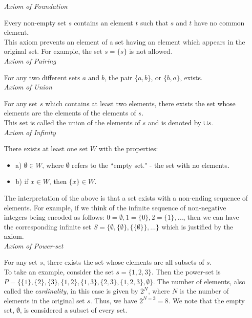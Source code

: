 \textit{Axiom of Foundation}

Every non-empty set $s$ contains an element $t$ such that $s$ and $t$ have no common element.\\

This axiom prevents an element of a set having an element which appears in the original set.  For example, the set $s=\{s\}$ is not allowed.\\

\textit{Axiom of Pairing}

For any two different sets $a$ and $b$, the pair $\{a,b\}$, or $\{b,a\}$, exists.\\

\textit{Axiom of Union}

For any set $s$ which contains at least two elements, there exists the set whose elements are the elements of the elements of $s.$ \\ 

This set is called the union of the elements of $s$ and is denoted by $\cup s.$  \\

\textit{Axiom of Infinity}

There exists at least one set $W$ with the properties:

\begin{itemize}
\item a) $\emptyset \in W$, where $\emptyset$ refers to the ``empty set." - the set with no elements.
\item b) if $x \in W$, then $\{x\} \in W.$
\end{itemize}

The interpretation of the above is that a set exists with a non-ending sequence of elements.  For example, if we think of the infinite sequence of non-negative integers being encoded as follows:  $0 = \emptyset, 1=\{ 0 \}, 2=\{1\}, \ldots$, then we can have the corresponding infinite set $S=\{\emptyset, \{\emptyset\}, \{\{\emptyset\}\}, \ldots \}$ which is justified by the axiom.\\

\textit{Axiom of Power-set}

For any set $s$, there exists the set whose elements are all subsets of $s$.\\

To take an example, consider the set $s = \{1,2,3 \}$.  Then the power-set is $P=\{\{1\}, \{2\}, \{3\}, \{1,2\}, \{1,3\}, \{2,3\}, \{1,2,3\}, \emptyset \}$.  The number of elements, also called the \textit{cardinality}, in this case is given by $2^{N}$, where $N$ is the number of elements in the original set $s$.  Thus, we have $2^{N=3}=8$.  We note that the empty set, $\emptyset$, is considered a subset of every set.\\

